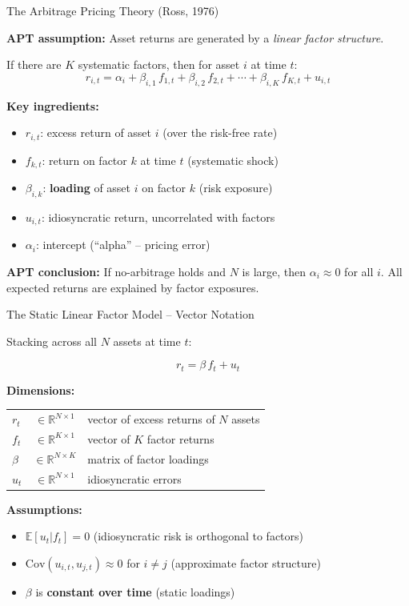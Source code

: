\documentclass[aspectratio=169]{beamer}
\newcommand{\E}{\mathbb{E}}
\newcommand{\Cov}{\text{Cov}}
\newcommand{\R}{\mathbb{R}}
\begin{document}
\begin{frame}{The Arbitrage Pricing Theory (Ross, 1976)}

\textbf{APT assumption:} Asset returns are generated by a \emph{linear factor structure}.

\vspace{0.5em}
If there are $K$ systematic factors, then for asset $i$ at time $t$:
\[
r_{i,t} = \alpha_i + \beta_{i,1}\, f_{1,t} + \beta_{i,2}\, f_{2,t} + \cdots + \beta_{i,K}\, f_{K,t} + u_{i,t}
\]

\textbf{Key ingredients:}
\begin{itemize}
    \item $r_{i,t}$: excess return of asset $i$ (over the risk-free rate)
    \item $f_{k,t}$: return on factor $k$ at time $t$ (systematic shock)
    \item $\beta_{i,k}$: \textbf{loading} of asset $i$ on factor $k$ (risk exposure)
    \item $u_{i,t}$: idiosyncratic return, uncorrelated with factors
    \item $\alpha_i$: intercept (``alpha'' -- pricing error)
\end{itemize}

\vspace{0.5em}
\textbf{APT conclusion:} If no-arbitrage holds and $N$ is large, then $\alpha_i \approx 0$ for all $i$. All expected returns are explained by factor exposures.
\end{frame}
%
%
\begin{frame}{The Static Linear Factor Model -- Vector Notation}

Stacking across all $N$ assets at time $t$:

$$
\boxed{r_t = \beta\, f_t + u_t}
$$

\vspace{0.3em}
\textbf{Dimensions:}
\begin{center}
\renewcommand{\arraystretch}{1.3}
\begin{tabular}{lcl}
$r_t$ & $\in \R^{N \times 1}$ & vector of excess returns of $N$ assets \\
$f_t$ & $\in \R^{K \times 1}$ & vector of $K$ factor returns \\
$\beta$ & $\in \R^{N \times K}$ & matrix of factor loadings \\
$u_t$ & $\in \R^{N \times 1}$ & idiosyncratic errors \\
\end{tabular}
\end{center}

\vspace{0.5em}
\textbf{Assumptions:}
\begin{itemize}
    \item $\E[u_t | f_t] = 0$ \quad (idiosyncratic risk is orthogonal to factors)
    \item $\Cov(u_{i,t}, u_{j,t}) \approx 0$ for $i \neq j$ \quad (approximate factor structure)
    \item $\beta$ is \textbf{constant over time} \quad (static loadings)
\end{itemize}
\end{frame}
\end{document}
